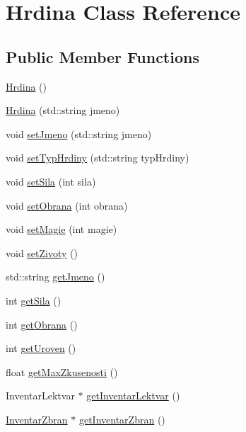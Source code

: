 \hypertarget{class_hrdina}{\section{Hrdina Class Reference}
\label{class_hrdina}
}
\subsection*{Public Member Functions}
\begin{DoxyCompactItemize}
\item 
\hyperlink{class_hrdina_af3946c5ee051376dcab3b0d6b1d3f089}{Hrdina} ()
\item 
\hyperlink{class_hrdina_a3b021c71304b51ef4d2cd3c37cdc5b59}{Hrdina} (std\-::string jmeno)
\item 
void \hyperlink{class_hrdina_aba86825ebf33a0904f70764833a7d5db}{set\-Jmeno} (std\-::string jmeno)
\item 
void \hyperlink{class_hrdina_af30fa09e3fe0f943a6317d3fe92803e2}{set\-Typ\-Hrdiny} (std\-::string typ\-Hrdiny)
\item 
void \hyperlink{class_hrdina_a56f15ba39c3367268040567992538ffa}{set\-Sila} (int sila)
\item 
void \hyperlink{class_hrdina_a7777660660acc63dc973594d95f5c38a}{set\-Obrana} (int obrana)
\item 
void \hyperlink{class_hrdina_a1ea9b5c067c4319c5d493a56d8ce38f1}{set\-Magie} (int magie)
\item 
void \hyperlink{class_hrdina_ab810414abcfa07f38b316300b090185a}{set\-Zivoty} ()
\item 
std\-::string \hyperlink{class_hrdina_a9c01338eff8f5c34c3cbb659e97dacaf}{get\-Jmeno} ()
\item 
int \hyperlink{class_hrdina_a8e8465ad136d7c8b0bc34260bf1e39ef}{get\-Sila} ()
\item 
int \hyperlink{class_hrdina_a73df143a15e119544e620839e7ad0ec9}{get\-Obrana} ()
\item 
int \hyperlink{class_hrdina_a06429e3ba900af41c87ca39a27c6f5b3}{get\-Uroven} ()
\item 
float \hyperlink{class_hrdina_a397b0e79c7fceeafa8cd6abc7119dfb8}{get\-Max\-Zkusenosti} ()
\item 
Inventar\-Lektvar $\ast$ \hyperlink{class_hrdina_a4f27a7c57ea3daa9fad7ed4d3062e5c3}{get\-Inventar\-Lektvar} ()
\item 
\hyperlink{class_inventar_zbran}{Inventar\-Zbran} $\ast$ \hyperlink{class_hrdina_a702af528983040c4e42aaf81857aa091}{get\-Inventar\-Zbran} ()

\end{DoxyCompactItemize}
